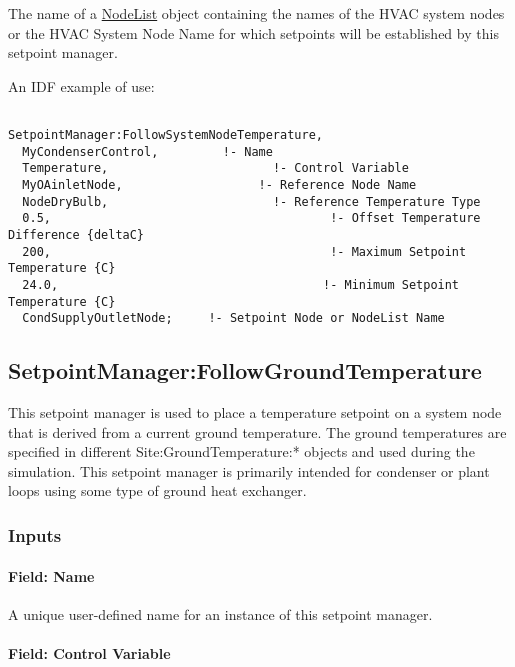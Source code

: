 The name of a \hyperref[nodelist]{NodeList} object containing the names of the HVAC system nodes or the HVAC System Node Name for which setpoints will be established by this setpoint manager.

An IDF example of use:

\begin{lstlisting}

SetpointManager:FollowSystemNodeTemperature,
  MyCondenserControl,         !- Name
  Temperature,                       !- Control Variable
  MyOAinletNode,                   !- Reference Node Name
  NodeDryBulb,                       !- Reference Temperature Type
  0.5,                                       !- Offset Temperature Difference {deltaC}
  200,                                       !- Maximum Setpoint Temperature {C}
  24.0,                                     !- Minimum Setpoint Temperature {C}
  CondSupplyOutletNode;     !- Setpoint Node or NodeList Name
\end{lstlisting}

\subsection{SetpointManager:FollowGroundTemperature}\label{setpointmanagerfollowgroundtemperature}

This setpoint manager is used to place a temperature setpoint on a system node that is derived from a current ground temperature. The ground temperatures are specified in different Site:GroundTemperature:* objects and used during the simulation. This setpoint manager is primarily intended for condenser or plant loops using some type of ground heat exchanger.

\subsubsection{Inputs}\label{inputs-22-004}

\paragraph{Field: Name}\label{field-name-22-002}

A unique user-defined name for an instance of this setpoint manager.

\paragraph{Field: Control Variable}\label{field-control-variable-16}

